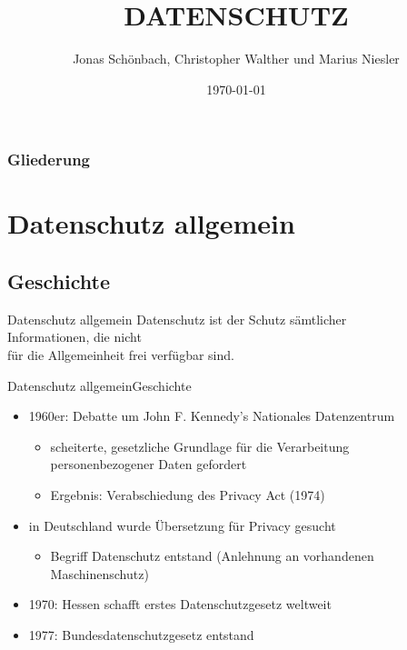 \documentclass[9pt]{beamer}
\title{DATENSCHUTZ}
\subtitle{}
\author{Jonas Schönbach, Christopher Walther und Marius Niesler}
\institute{SRH Berufsbildungswerk Dresden}
\date{\today}
\begin{document}
    \titlepage

    \begin{frame}
        \frametitle{Gliederung}
        \tableofcontents
    \end{frame}



    \section{Datenschutz allgemein}
        \subsection{Geschichte}
            \begin{frame}{Datenschutz allgemein}{}
                \centering\huge
                {
                   Datenschutz ist der Schutz sämtlicher\\Informationen,
                   die nicht\\für die Allgemeinheit frei verfügbar sind.
                }
            \end{frame}
            \begin{frame}{Datenschutz allgemein}{Geschichte}
            \begin{itemize}
                \item 1960er: Debatte um John F. Kennedy's Nationales Datenzentrum
                \begin{itemize}
                    \item scheiterte, gesetzliche Grundlage für die Verarbeitung \\personenbezogener Daten gefordert
                    \item Ergebnis: Verabschiedung des Privacy Act (1974)
                \end{itemize}
                \item in Deutschland wurde Übersetzung für Privacy gesucht
                \begin{itemize}
                    \item Begriff Datenschutz entstand (Anlehnung an vorhandenen Maschinenschutz)
                \end{itemize}
                \item 1970: Hessen schafft erstes Datenschutzgesetz weltweit
                \item 1977: Bundesdatenschutzgesetz entstand
            \end{itemize}
            \end{frame}
\end{document}

